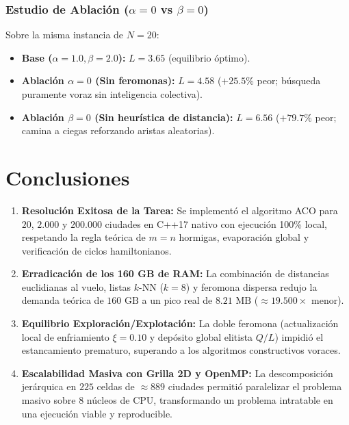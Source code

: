 \documentclass[11pt,a4paper]{article}
\begin{document}
\subsubsection{Estudio de Ablación (\texorpdfstring{$\alpha = 0$ vs $\beta = 0$}{alpha = 0 vs beta = 0})}
Sobre la misma instancia de $N = 20$:
\begin{itemize}
    \item \textbf{Base ($\alpha=1.0, \beta=2.0$):} $L = \mathbf{3.65}$ (equilibrio óptimo).
    \item \textbf{Ablación $\alpha = 0$ (Sin feromonas):} $L = \mathbf{4.58}$ ($+25.5\%$ peor; búsqueda puramente voraz sin inteligencia colectiva).
    \item \textbf{Ablación $\beta = 0$ (Sin heurística de distancia):} $L = \mathbf{6.56}$ ($+79.7\%$ peor; camina a ciegas reforzando aristas aleatorias).
\end{itemize}

\section{Conclusiones}

\begin{enumerate}
    \item \textbf{Resolución Exitosa de la Tarea:} Se implementó el algoritmo ACO para $20$, $2.000$ y $200.000$ ciudades en C++17 nativo con ejecución 100\% local, respetando la regla teórica de $m=n$ hormigas, evaporación global y verificación de ciclos hamiltonianos.
    \item \textbf{Erradicación de los 160 GB de RAM:} La combinación de distancias euclidianas al vuelo, listas $k$-NN ($k=8$) y feromona dispersa redujo la demanda teórica de $160\text{ GB}$ a un pico real de \textbf{$8.21\text{ MB}$} ($\approx 19.500\times$ menor).
    \item \textbf{Equilibrio Exploración/Explotación:} La doble feromona (actualización local de enfriamiento $\xi = 0.10$ y depósito global elitista $Q/L$) impidió el estancamiento prematuro, superando a los algoritmos constructivos voraces.
    \item \textbf{Escalabilidad Masiva con Grilla 2D y OpenMP:} La descomposición jerárquica en $225$ celdas de $\approx 889$ ciudades permitió paralelizar el problema masivo sobre 8 núcleos de CPU, transformando un problema intratable en una ejecución viable y reproducible.
\end{enumerate}
\end{document}

